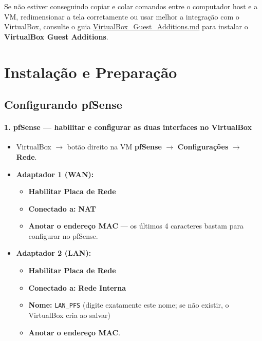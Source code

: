 \begin{notebox}
Se não estiver conseguindo copiar e colar comandos entre o computador host e a VM, redimensionar a tela corretamente ou usar melhor a integração com o VirtualBox, consulte o guia \href{https://github.com/vin1sss/T02---Redes-de-Dados-1/blob/main/VirtualBox_Guest_Additions.md}{VirtualBox\_Guest\_Additions.md} para instalar o \textbf{VirtualBox Guest Additions}.
\end{notebox}

\section{Instalação e Preparação}

\subsection{Configurando pfSense}

\paragraph{1. pfSense --- habilitar e configurar as duas interfaces no VirtualBox}

\begin{itemize}
  \item VirtualBox $\rightarrow$ botão direito na VM \textbf{pfSense} $\rightarrow$ \textbf{Configurações} $\rightarrow$ \textbf{Rede}.
  \item \textbf{Adaptador 1 (WAN):}
  \begin{itemize}
    \item \textbf{Habilitar Placa de Rede}
    \item \textbf{Conectado a:} \textbf{NAT}
    \item \textbf{Anotar o endereço MAC} --- os últimos 4 caracteres bastam para configurar no pfSense.
  \end{itemize}
\end{itemize}


\begin{itemize}
  \item \textbf{Adaptador 2 (LAN):}
  \begin{itemize}
    \item \textbf{Habilitar Placa de Rede}
    \item \textbf{Conectado a:} \textbf{Rede Interna}
    \item \textbf{Nome:} \texttt{LAN\_PFS} (digite exatamente este nome; se não existir, o VirtualBox cria ao salvar)
    \item \textbf{Anotar o endereço MAC}.
  \end{itemize}
\end{itemize}


